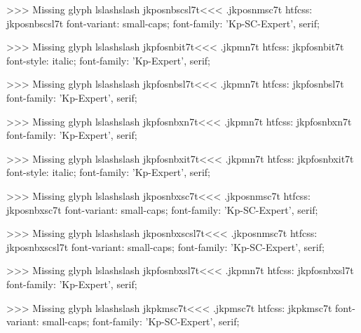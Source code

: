 >>>
Missing glyph	lslashslash
\<jkposnbscsl7t\><<<
.jkposnmsc7t
htfcss:  jkposnbscsl7t  font-variant: small-caps; font-family: 'Kp-SC-Expert', serif;

>>>
Missing glyph	lslashslash
\<jkpfosnbit7t\><<<
.jkpmn7t
htfcss:  jkpfosnbit7t  font-style: italic; font-family: 'Kp-Expert', serif;

>>>
Missing glyph	lslashslash
\<jkpfosnbsl7t\><<<
.jkpmn7t
htfcss:  jkpfosnbsl7t  font-family: 'Kp-Expert', serif;

>>>
Missing glyph	lslashslash
\<jkpfosnbxn7t\><<<
.jkpmn7t
htfcss:  jkpfosnbxn7t  font-family: 'Kp-Expert', serif;

>>>
Missing glyph	lslashslash
\<jkpfosnbxit7t\><<<
.jkpmn7t
htfcss:  jkpfosnbxit7t  font-style: italic; font-family: 'Kp-Expert', serif;

>>>
Missing glyph	lslashslash
\<jkposnbxsc7t\><<<
.jkposnmsc7t
htfcss:  jkposnbxsc7t  font-variant: small-caps; font-family: 'Kp-SC-Expert', serif;

>>>
Missing glyph	lslashslash
\<jkposnbxscsl7t\><<<
.jkposnmsc7t
htfcss:  jkposnbxscsl7t  font-variant: small-caps; font-family: 'Kp-SC-Expert', serif;

>>>
Missing glyph	lslashslash
\<jkpfosnbxsl7t\><<<
.jkpmn7t
htfcss:  jkpfosnbxsl7t  font-family: 'Kp-Expert', serif;

>>>
Missing glyph	lslashslash
\<jkpkmsc7t\><<<
.jkpmsc7t
htfcss:  jkpkmsc7t  font-variant: small-caps; font-family: 'Kp-SC-Expert', serif;

